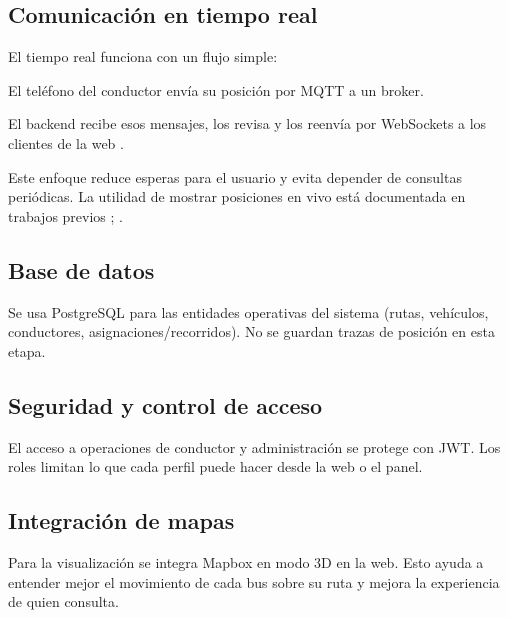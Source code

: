 \subsection{Comunicación en tiempo real}
El tiempo real funciona con un flujo simple:

El teléfono del conductor envía su posición por MQTT a un broker.

El backend recibe esos mensajes, los revisa y los reenvía por WebSockets a los clientes de la web \cite{sismo2016}.

Este enfoque reduce esperas para el usuario y evita depender de consultas periódicas. La utilidad de mostrar posiciones en vivo está documentada en trabajos previos \cite{cityruta2018}; \cite{stopbus2016}.

\subsection{Base de datos}
Se usa PostgreSQL para las entidades operativas del sistema (rutas, vehículos, conductores, asignaciones/recorridos). No se guardan trazas de posición en esta etapa.

\subsection{Seguridad y control de acceso}
El acceso a operaciones de conductor y administración se protege con JWT. Los roles limitan lo que cada perfil puede hacer desde la web o el panel.

\subsection{Integración de mapas}
Para la visualización se integra Mapbox en modo 3D en la web. Esto ayuda a entender mejor el movimiento de cada bus sobre su ruta y mejora la experiencia de quien consulta.